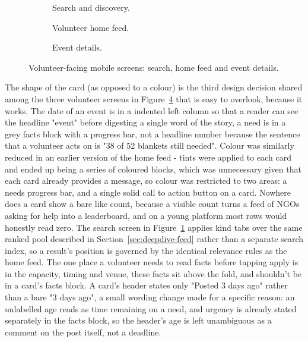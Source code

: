 \begin{figure}[H]
\centering
\begin{subfigure}[t]{0.31\textwidth}
  \centering
  \caption{Search and discovery.}
  \label{fig:search-discovery}
\end{subfigure}\hfill
\begin{subfigure}[t]{0.31\textwidth}
  \centering
  \caption{Volunteer home feed.}
  \label{fig:volunteer-home}
\end{subfigure}\hfill
\begin{subfigure}[t]{0.31\textwidth}
  \centering
  \caption{Event details.}
  \label{fig:event-details}
\end{subfigure}
\caption{Volunteer-facing mobile screens: search, home feed and event details.}
\label{fig:ui-volunteer}
\end{figure}
\clearpage
\noindent The shape of the card (as opposed to a colour) is the third design decision shared among the three volunteer screens in Figure~\ref{fig:ui-volunteer} that is easy to overlook, because it works. The date of an event is in a indented left column so that a reader can see the headline "event" before digesting a single word of the story, a need is in a grey facts block with a progress bar, not a headline number because the sentence that a volunteer acts on is "38 of 52 blankets still needed". Colour was similarly reduced in an earlier version of the home feed - tints were applied to each card and ended up being a series of coloured blocks, which was unnecessary given that each card already provides a message, so colour was restricted to two areas: a needs progress bar, and a single solid call to action button on a card. Nowhere does a card show a bare like count, because a visible count turns a feed of NGOs asking for help into a leaderboard, and on a young platform most rows would honestly read zero. The search screen in Figure~\ref{fig:search-discovery} applies kind tabs over the same ranked pool described in Section~\ref{sec:deepdive-feed} rather than a separate search index, so a result's position is governed by the identical relevance rules as the home feed. The one place a volunteer needs to read facts before tapping apply is in the capacity, timing and venue, these facts sit above the fold, and shouldn't be in a card's facts block. A card's header states only "Posted 3 days ago" rather than a bare "3 days ago", a small wording change made for a specific reason: an unlabelled age reads as time remaining on a need, and urgency is already stated separately in the facts block, so the header's age is left unambiguous as a comment on the post itself, not a deadline.

